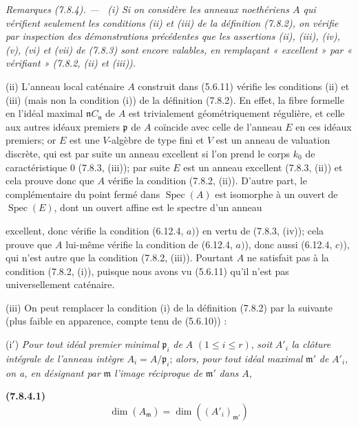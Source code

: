 \documentclass[10pt,oneside]{book}
\makeatletter
\newcommand{\oldpage}[2][]{%
  \setcounter{footnote}{0}%
  \marginpar{\scriptsize\textbf{#1}~|~#2}\ignorespaces}
\newenvironment{env}[1][]{\par\medskip\noindent\textbf{(#1)}\ }{\par}
\newenvironment{remarks}[1][]{%
  \par\medskip\noindent\itshape Remarques (#1). ---\ }{\par}
\newcommand{\EGAReaderTarget}[2]{\hypertarget{#1}{}\@bsphack\begingroup\def\@currentHref{#1}\label{#2}\endgroup\@esphack}
\makeatother
\begin{document}
\begin{remarks}[7.8.4]
\EGAReaderTarget{ega4.c04.item.7-8-4}{IV.2.s7.8.4-fr}
\upshape
(i) Si on considère les anneaux noethériens $A$ qui vérifient seulement les
conditions (ii) et (iii) de la définition (7.8.2), on vérifie par inspection
des démonstrations précédentes que les assertions (ii), (iii), (iv), (v), (vi)
et (vii) de (7.8.3) sont encore valables, en remplaçant « excellent » par
« vérifiant » (7.8.2, (ii) et (iii)).

(ii) L'anneau local caténaire $A$ construit dans (5.6.11) vérifie les
conditions (ii) et (iii) (mais non la condition (i)) de la définition (7.8.2).
En effet, la fibre formelle en l'idéal maximal $\mathfrak n C_{\mathfrak n}$ de
$A$ est trivialement géométriquement régulière, et celle aux autres idéaux
premiers $\mathfrak p$ de $A$ coïncide avec celle de l'anneau $E$ en ces idéaux
premiers; or $E$ est une $V$-algèbre de type fini et $V$ est un anneau de
valuation discrète, qui est par suite un anneau excellent si l'on prend le
corps $k_0$ de caractéristique $0$ (7.8.3, (iii)); par suite $E$ est un anneau
excellent (7.8.3, (ii)) et cela prouve donc que $A$ vérifie la condition (7.8.2,
(ii)). D'autre part, le complémentaire du point fermé dans
$\operatorname{Spec}(A)$ est isomorphe à un ouvert de $\operatorname{Spec}(E)$,
dont un ouvert affine est le spectre d'un anneau

\oldpage[IV-2]{217}

excellent, donc vérifie la condition (6.12.4, $a)$) en vertu de (7.8.3, (iv));
cela prouve que $A$ lui-même vérifie la condition de (6.12.4, $a)$), donc aussi
(6.12.4, $c)$), qui n'est autre que la condition (7.8.2, (iii)). Pourtant $A$
ne satisfait pas à la condition (7.8.2, (i)), puisque nous avons vu (5.6.11)
qu'il n'est pas universellement caténaire.

(iii) On peut remplacer la condition (i) de la définition (7.8.2) par la
suivante (plus faible en apparence, compte tenu de (5.6.10)) :

(i$'$) \emph{Pour tout idéal premier minimal} $\mathfrak p_i$ \emph{de} $A$
$(1\leq i\leq r)$, \emph{soit} $A'_i$ \emph{la clôture intégrale de l'anneau
intègre} $A_i=A/\mathfrak p_i$; \emph{alors, pour tout idéal maximal}
$\mathfrak m'$ \emph{de} $A'_i$, \emph{on a, en désignant par} $\mathfrak m$
\emph{l'image réciproque de} $\mathfrak m'$ \emph{dans} $A$,
\begin{env}[7.8.4.1]
\label{IV.2.s7.8.4.1-fr}
\[
\dim(A_{\mathfrak m})=\dim((A'_i)_{\mathfrak m'})
\]
\end{env}


\end{remarks}
\end{document}
